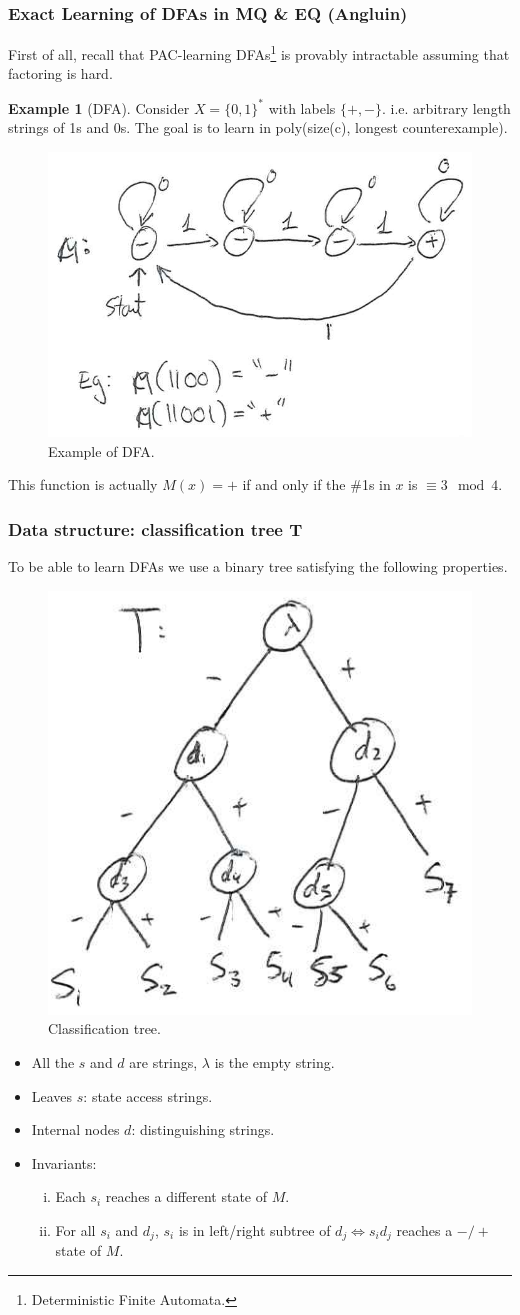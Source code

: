 \documentclass[12pt, letterpaper]{article}
\numberwithin{equation}{section} %
\theoremstyle{definition}
\newtheorem{example}[theorem]{Example}
\theoremstyle{remark}
\begin{document}
\subsubsection{Exact Learning of DFAs in MQ \& EQ (Angluin)}
First of all, recall that PAC-learning DFAs\footnote{Deterministic Finite Automata.}  is provably intractable assuming that factoring is hard.
\begin{example}[DFA]
Consider $X=\lbrace 0, 1\rbrace^*$ with labels $\lbrace +, -\rbrace$. i.e. arbitrary length strings of 1s and 0s. The goal is to learn in poly(size(c), longest counterexample).
\begin{figure}[H]
\centering
\includegraphics[width=0.6\linewidth]{img/dfa.png}
\caption{Example of DFA.}
\end{figure}
This function is actually $M(x) = +$ if and only if the \#1s in $x$ is $\equiv 3 \mod 4$.
\end{example}

\subsubsection*{Data structure: classification tree T}
To be able to learn DFAs we use a binary tree satisfying the following properties.
\begin{figure}[H]
\centering
\includegraphics[width=0.3\linewidth]{img/dfa-tree.png}
\caption{Classification tree.}
\end{figure}
\begin{itemize}
\item All the $s$ and $d$ are strings, $\lambda$ is the empty string.
\item Leaves $s$: state access strings.
\item Internal nodes $d$: distinguishing strings.
\item Invariants:
    \begin{enumerate}[i)]
    \item Each $s_i$ reaches a different state of $M$.
    \item For all $s_i$ and $d_j$, $s_i$ is in left/right subtree of $d_j \iff s_id_j$ reaches a $-/+$ state of $M$.
    \end{enumerate}
\end{itemize}
\end{document}

